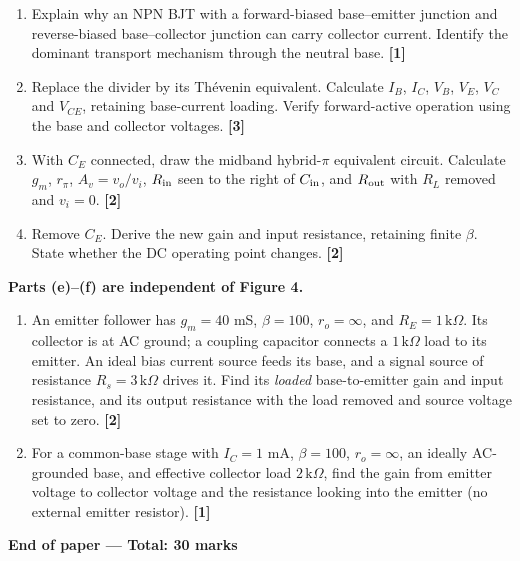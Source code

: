 \documentclass[11pt,a4paper]{article}
\newcommand{\m}[1]{\hfill\textbf{[#1]}}
\newcommand{\kohm}{\,\mathrm{k}\Omega}
\begin{document}
\begin{enumerate}[label=(\alph*)]
\item Explain why an NPN BJT with a forward-biased base--emitter junction and reverse-biased base--collector junction can carry collector current. Identify the dominant transport mechanism through the neutral base. \m{1}
\item Replace the divider by its Th\'evenin equivalent. Calculate $I_B$, $I_C$, $V_B$, $V_E$, $V_C$ and $V_{CE}$, retaining base-current loading. Verify forward-active operation using the base and collector voltages. \m{3}
\item With $C_E$ connected, draw the midband hybrid-$\pi$ equivalent circuit. Calculate $g_m$, $r_\pi$, $A_v=v_o/v_i$, $R_{\rm in}$ seen to the right of $C_{\rm in}$, and $R_{\rm out}$ with $R_L$ removed and $v_i=0$. \m{2}
\item Remove $C_E$. Derive the new gain and input resistance, retaining finite $\beta$. State whether the DC operating point changes. \m{2}
\end{enumerate}
\textbf{Parts (e)--(f) are independent of Figure 4.}
\begin{enumerate}[label=(\alph*),start=5]
\item An emitter follower has $g_m=40$ mS, $\beta=100$, $r_o=\infty$, and $R_E=1\kohm$. Its collector is at AC ground; a coupling capacitor connects a $1\kohm$ load to its emitter. An ideal bias current source feeds its base, and a signal source of resistance $R_s=3\kohm$ drives it. Find its \emph{loaded} base-to-emitter gain and input resistance, and its output resistance with the load removed and source voltage set to zero. \m{2}
\item For a common-base stage with $I_C=1$ mA, $\beta=100$, $r_o=\infty$, an ideally AC-grounded base, and effective collector load $2\kohm$, find the gain from emitter voltage to collector voltage and the resistance looking into the emitter (no external emitter resistor). \m{1}
\end{enumerate}
\vfill\begin{center}\textbf{End of paper --- Total: 30 marks}\end{center}
\end{document}
